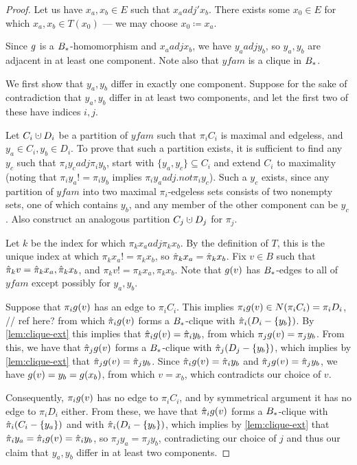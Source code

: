 \documentclass{amsart}
\theoremstyle{definition}
\newcommand{\cupdot}{\mathbin{\mathaccent\cdot\cup}}
\begin{document}
\begin{proof} 

  Let us have $x_a, x_b \in E$ such that $x_a adj' x_b$. There exists some $x_0 \in E$ for which $x_a, x_b \in T(x_0)$ --- we may choose $x_0 \coloneqq x_a$.

  Since $g$ is a $B_*$-homomorphism and $x_a adj x_b$, we have $y_a adj y_b$, so $y_a, y_b$ are adjacent in at least one component. Note also that $yfam$ is a clique in $B_*$.

  We first show that $y_a, y_b$ differ in exactly one component.
  Suppose for the sake of contradiction that $y_a, y_b$ differ in at least two components, and let the first two of these have indices $i, j$.

  Let $C_i \cupdot D_i$ be a partition of $yfam$ such that $\pi_i C_i$ is maximal and edgeless, and $y_a \in C_i, y_b \in D_i$. To prove that such a partition exists, it is sufficient to find any $y_c$ such that $\pi_i y_c adj \pi_i y_b$, start with $\{y_a, y_c\} \subseteq C_i$ and extend $C_i$ to maximality (noting that $\pi_i y_a != \pi_i y_b$ implies $\pi_i y_a adj.not \pi_i y_c$). Such a $y_c$ exists, since any partition of $yfam$ into two maximal $\pi_i$‑edgeless sets consists of two nonempty sets, one of which contains $y_b$, and any member of the other component can be $y_c$.
  Also construct an analogous partition $C_j \cupdot D_j$ for $\pi_j$.

  Let $k$ be the index for which $\pi_k x_a adj \pi_k x_b$. By the definition of $T$, this is the unique index at which $\pi_k x_a != \pi_k x_b$, so $\hat{\pi}_k x_a = \hat{\pi}_k x_b$. Fix $v \in B$ such
  that $\hat{\pi}_k v = \hat{\pi}_k x_a, \hat{\pi}_k x_b$, and $\pi_k v != \pi_k x_a, \pi_k x_b$. Note that $g(v)$ has $B_*$-edges to all of $yfam$ except possibly for $y_a, y_b$.

  Suppose that $\pi_i g(v)$ has an edge to $\pi_i C_i$. This implies $\pi_i g(v) \in N(\pi_i C_i) = \pi_i D_i$,
  // ref here?
  from which $\hat{\pi}_i g(v)$ forms a $B_*$-clique with $\hat{\pi}_i (D_i - \{y_b\})$. By \autoref{lem:clique-ext} this implies that $\hat{\pi}_i g(v) = \hat{\pi}_i y_b$, from which $\pi_j g(v) = \pi_j y_b$. From this, we have that $\hat{\pi}_j g(v)$ forms a $B_*$-clique with $\hat{\pi}_j (D_j - \{y_b\})$, which implies by \autoref{lem:clique-ext} that $\hat{\pi}_j g(v) = \hat{\pi}_j y_b$. Since $\hat{\pi}_i g(v) = \hat{\pi}_i y_b$ and $\hat{\pi}_j g(v) = \hat{\pi}_j y_b$, we have $g(v) = y_b = g(x_b)$, from which $v = x_b$, which contradicts our choice of $v$.

  Consequently, $\pi_i g(v)$ has no edge to $\pi_i C_i$, and by symmetrical argument it has no edge to $\pi_i D_i$ either. From these, we have that $\hat{\pi}_i g(v)$ forms a $B_*$-clique with $\hat{\pi}_i (C_i - \{y_a\})$ and with $\hat{\pi}_i (D_i - \{y_b\})$, which implies by \autoref{lem:clique-ext} that $\hat{\pi}_i y_a = \hat{\pi}_i g(v) = \hat{\pi}_i y_b$, so $\pi_j y_a = \pi_j y_b$, contradicting our choice of $j$ and thus our claim that $y_a, y_b$ differ in at least two components.


\end{proof}
\end{document}
